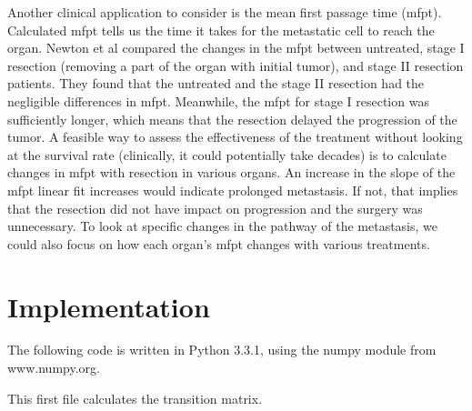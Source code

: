 \documentclass[letterpaper,12pt]{article}
\begin{document}
Another clinical application to consider is the mean first passage time (mfpt). Calculated mfpt tells us the time it takes for the metastatic cell to reach the organ. Newton et al compared the changes in the mfpt between untreated, stage I resection (removing a part of the organ with initial tumor), and stage II resection patients. They found that the untreated and the stage II resection had the negligible differences in mfpt. Meanwhile, the mfpt for stage I resection was sufficiently longer, which means that the resection delayed the progression of the tumor. A feasible way to assess the effectiveness of the treatment without looking at the survival rate (clinically, it could potentially take decades) is to calculate changes in mfpt with resection in various organs. An increase in the slope of the mfpt linear fit increases would indicate prolonged metastasis. If not, that implies that the resection did not have impact on progression and the surgery was unnecessary. To look at specific changes in the pathway of the metastasis, we could also focus on how each organ’s mfpt changes with various treatments.

\section{Implementation}

The following code is written in Python 3.3.1, using the numpy module from www.numpy.org.

This first file calculates the transition matrix.
\end{document}

